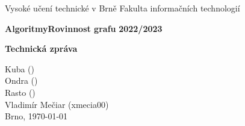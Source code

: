 \documentclass[12pt,a4paper]{article}
\begin{document}
    \pagestyle{empty}
    \begin{titlepage}
        \begin{center}
            \normalsize{Vysoké učení technické v Brně\linebreak}
            \normalsize{Fakulta informačních technologií}

            \vfill

            \large\textbf{Algoritmy\linebreak Rovinnost grafu}
            \large\textbf{2022/2023}

            \vfill

            \LARGE\textbf{Technická zpráva\linebreak}

            \vfill
            \vfill
            \vfill


            \begin{flushleft}
                \large
                Kuba ()\\
                Ondra ()\\
                Rasto ()\\
                Vladimír Mečiar (xmecia00)\\
                \hfill
                Brno, \today
            \end{flushleft}
        \end{center}
    \end{titlepage}
    \pagestyle{plain}
    \newpage

    \tableofcontents
    \newpage


    
\end{document}

